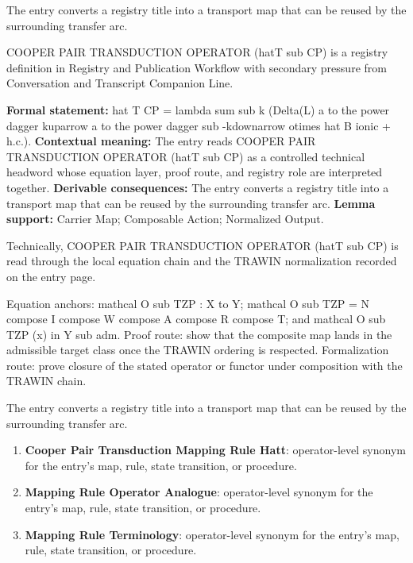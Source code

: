 The entry converts a registry title into a transport map that can be reused by the surrounding transfer arc.
\clearpage


\begingroup\small
{}
COOPER PAIR TRANSDUCTION OPERATOR (hatT sub CP) is a registry definition in Registry and Publication Workflow with secondary pressure from Conversation and Transcript Companion Line.

\begingroup\footnotesize\setlength{\emergencystretch}{3em}\sloppy
\textbf{Formal statement:} hat T CP = lambda sum sub k (Delta(L) a to the power dagger kuparrow a to the power dagger sub -kdownarrow otimes hat B ionic + h.c.). \textbf{Contextual meaning:} The entry reads COOPER PAIR TRANSDUCTION OPERATOR (hatT sub CP) as a controlled technical headword whose equation layer, proof route, and registry role are interpreted together. \textbf{Derivable consequences:} The entry converts a registry title into a transport map that can be reused by the surrounding transfer arc. \textbf{Lemma support:} Carrier Map; Composable Action; Normalized Output.\par
\endgroup

Technically, COOPER PAIR TRANSDUCTION OPERATOR (hatT sub CP) is read through the local equation chain and the TRAWIN normalization recorded on the entry page.

Equation anchors: mathcal O sub TZP : X to Y; mathcal O sub TZP = N compose I compose W compose A compose R compose T; and mathcal O sub TZP (x) in Y sub adm. Proof route: show that the composite map lands in the admissible target class once the TRAWIN ordering is respected. Formalization route: prove closure of the stated operator or functor under composition with the TRAWIN chain.

The entry converts a registry title into a transport map that can be reused by the surrounding transfer arc.
\endgroup

\begin{enumerate}[leftmargin=1.6em,itemsep=6pt,topsep=4pt]
\item \textbf{Cooper Pair Transduction Mapping Rule Hatt}: operator-level synonym for the entry's map, rule, state transition, or procedure.
\item \textbf{Mapping Rule Operator Analogue}: operator-level synonym for the entry's map, rule, state transition, or procedure.
\item \textbf{Mapping Rule Terminology}: operator-level synonym for the entry's map, rule, state transition, or procedure.
\end{enumerate}

